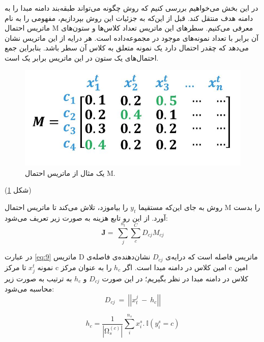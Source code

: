 {{		\subsubsection{}
		{
			در این بخش می‌خواهیم بررسی کنیم که روش 
			چگونه می‌تواند طبقه‌بند دامنه مبدا را به دامنه هدف منتقل کند. قبل از این‌که به جزئیات این روش بپردازیم، مفهومی را به نام ماتریس احتمال M معرفی می‌کنیم. سطر‌های این ماتریس تعداد کلاس‌ها و ستون‌های آن برابر با تعداد نمونه‌های موجود در مجموعه‌داده است. هر درایه از این ماتریس نشان می‌دهد که چقدر احتمال دارد یک نمونه متعلق به کلاس آن سطر باشد. بنابراین جمع احتمال‌های یک ستون در این ماتریس برابر یک است.
			\begin{figure}[h]
				\centering
				\includegraphics[scale=0.3]{images/annotation.JPG}
				\caption{یک مثال از ماتریس احتمال M.}
				\label{fig:7}
			\end{figure}
			(شکل
			\ref{fig:7})
			
			روش 
			به جای این‌که مستقیما 
			$y_t$
			را بیاموزد، تلاش می‌کند تا ماتریس احتمال M را بدست آورد. از این رو تابع هزینه به صورت زیر تعریف می‌شود:
			\begin{equation}
			\mathbf{J}=\ \sum_{j}^{n_t}\sum_{c}^{C}{D_{cj}}M_{cj}
			\label{eq:9}
			\end{equation}
			
			در عبارت 
			\ref{eq:9}
			ماتریس D ماتریس فاصله است که درایه‌ی 
			$D_{cj}$
			نشان‌دهنده‌ی فاصله‌ی نمونه
			$x_j^t$
			تا مرکز c‌ امین کلاس در دامنه مبدا است. اگر 
			$h_c$
			را به عنوان مرکز  c‌ امین کلاس در دامنه مبدا در نظر بگیریم؛ در این صورت 
			$D_{cj}$
			و 
			$h_c$
			به ترتیب به صورت زیر محاسبه می‌شود:
			\begin{equation}
			D_{cj}\ =\ \left|\left|x_t^j\ -\ h_c\right|\right|
			\label{eq:10}
			\end{equation}
			
			\begin{equation}
			h_c=\frac{1}{\left|\mathrm{\Omega}_s^{\left(c\right)}\right|}\sum_{i}^{n_s}{x_i^s.\ \mathbb{I}\left(y_i^s=c\right)}
			\label{eq:11}
			\end{equation}
			
}}}
